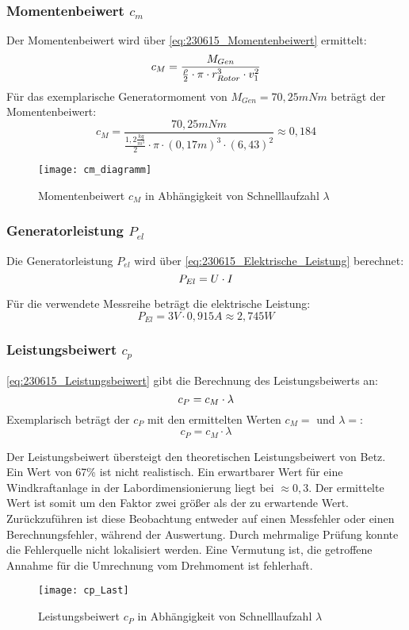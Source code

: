 \subsubsection*{Momentenbeiwert $c_m$}
Der Momentenbeiwert wird über \autoref{eq:230615_Momentenbeiwert} ermittelt:
\begin{equation}
    \centering
    c_M = \frac{M_{Gen}}{ \frac{\rho}{2} \cdot \pi \cdot r_{Rotor}^3 \cdot v_1^2}
    \label{eq:230615_Momentenbeiwert}
\end{equation}
Für das exemplarische Generatormoment von $M_{Gen} = 70,25mNm$ beträgt der Momentenbeiwert:
$$c_M = \frac{70,25mNm}{ \frac{1,2 \frac{kg}{m^3}}{2} \cdot \pi \cdot (0,17 m)^3 \cdot (6,43)^2}\approx 0,184$$

\begin{figure}[H]
    \centering
    \texttt{[image: cm\_diagramm]}
    \caption{Momentenbeiwert $c_M$ in Abhängigkeit von Schnelllaufzahl $\lambda$}
    \label{fig:Momentenbeiwert}
\end{figure}

\subsubsection*{Generatorleistung $P_{el}$}
Die Generatorleistung $P_{el}$ wird über \autoref{eq:230615_Elektrische_Leistung} berechnet:
\begin{equation}
    \centering
    P_{El} = U \cdot I
    \label{eq:230615_Elektrische_Leistung}
\end{equation}

Für die verwendete Messreihe beträgt die elektrische Leistung:
$$P_{El} = 3V \cdot 0,915A \approx 2,745W$$


\subsubsection*{Leistungsbeiwert $c_p$}
\autoref{eq:230615_Leistungsbeiwert} gibt die Berechnung des Leistungsbeiwerts an:
 \begin{equation}
     \centering
     c_P = c_M \cdot \lambda
     \label{eq:230615_Leistungsbeiwert}
 \end{equation}
Exemplarisch beträgt der $c_P$ mit den ermittelten Werten $c_M = $ und $\lambda =$:
 $$c_P = c_M \cdot \lambda$$

 Der Leistungsbeiwert übersteigt den theoretischen Leistungsbeiwert von Betz. Ein Wert von 67\% ist nicht realistisch. Ein erwartbarer Wert für eine Windkraftanlage in der Labordimensionierung liegt bei $\approx 0,3$. Der ermittelte Wert ist somit um den Faktor zwei größer als der zu erwartende Wert. Zurückzuführen ist diese Beobachtung entweder auf einen Messfehler oder einen Berechnungsfehler, während der Auswertung. Durch mehrmalige Prüfung konnte die Fehlerquelle nicht lokalisiert werden. Eine Vermutung ist, die getroffene Annahme für die Umrechnung vom Drehmoment ist fehlerhaft.
 \begin{figure}[H]
    \centering
    \texttt{[image: cp\_Last]}
    \caption{Leistungsbeiwert $c_P$ in Abhängigkeit von Schnelllaufzahl $\lambda$}
    \label{fig:cp_last}
\end{figure}
